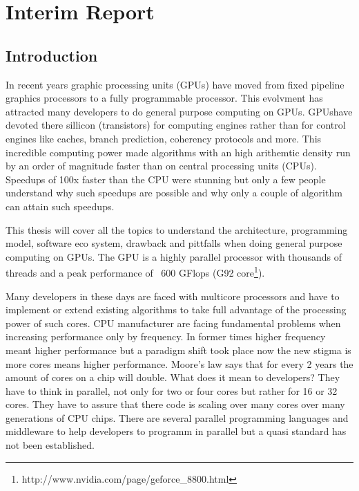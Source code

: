 \chapter{Interim Report}
\label{ch:interim_report}
\section*{Introduction} 
\label{sub:introduction} 

In recent years graphic processing units (GPUs) have moved from fixed pipeline
graphics processors to a fully programmable processor. This evolvment has
attracted many developers to do general purpose computing on GPUs. \glspl{GPU}have
devoted there sillicon (transistors) for computing engines rather than for
control engines like caches, branch prediction, coherency protocols and more.
This incredible computing power made algorithms with an high arithemtic density
run by an order of magnitude faster than on central processing units (CPUs).
Speedups of 100x faster than the CPU were stunning but only a few people
understand why such speedups are possible and why only a couple of algorithm can
attain such speedups.

This thesis will cover all the topics to understand the architecture,
programming model, software eco system, drawback and pittfalls when doing
general purpose computing on GPUs. The \gls{GPU} is a highly parallel processor with
thousands of threads and a peak performance of ~600 GFlops (G92
core\footnote{http://www.nvidia.com/page/geforce\_8800.html}).

Many developers in these days are faced with multicore processors and have to
implement or extend existing algorithms to take full advantage of the
processing power of such cores. CPU manufacturer are facing fundamental problems
when increasing performance only by frequency. In former times higher frequency
meant higher performance but a paradigm shift took place now the new stigma is
more cores means higher performance. Moore's law says that for every 2 years the
amount of cores on a chip will double. What does it mean to developers? They
have to think in parallel, not only for two or four cores but rather for 16 or
32 cores. They have to assure that there code is scaling over many cores over
many generations of CPU chips. There are several parallel programming languages
and middleware to help developers to programm in parallel but a quasi standard
has not been established.

